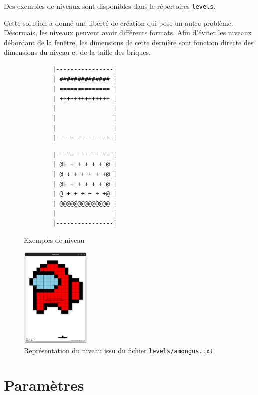 \documentclass[french]{template}
\begin{document}
Des exemples de niveaux sont disponibles dans le répertoires \texttt{levels}.

Cette solution a donné une liberté de création qui pose un autre problème. Désormais, les niveaux peuvent avoir différents formats. Afin d'éviter les niveaux débordant de la fenêtre, les dimensions de cette dernière sont fonction directe des dimensions du niveau et de la taille des briques.

\begin{figure}
    \begin{minipage}{0.4\textwidth}
        \begin{verbatim}
        |----------------|
        | ############## |
        | ============== |
        | ++++++++++++++ |
        |                |
        |                |
        |                |
        |----------------|
        \end{verbatim}
    \end{minipage}
    \hfill
    \begin{minipage}{0.4\textwidth}
        \begin{verbatim}
        |----------------|
        | @+ + + + + + @ |
        | @ + + + + + +@ |
        | @+ + + + + + @ |
        | @ + + + + + +@ |
        | @@@@@@@@@@@@@@ |
        |                |
        |----------------|
        \end{verbatim}
    \end{minipage}
    \caption{Exemples de niveau}
    \label{fig:level.txt}
\end{figure}

\begin{figure}
    \centering
    \includegraphics[width=0.3\textwidth]{img/amongus.png}
    \caption{Représentation du niveau issu du fichier \texttt{levels/amongus.txt}}
    \label{fig:amongus}
\end{figure}

\section{Paramètres}
\end{document}
